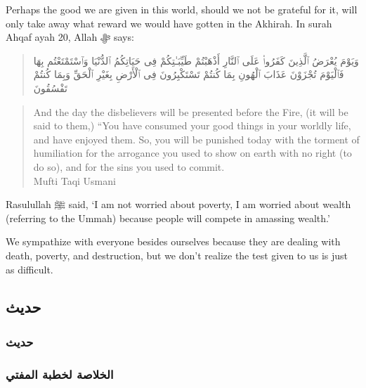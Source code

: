 \documentclass[
]{book}
\begin{document}
Perhaps the good we are given in this world, should we not be grateful for it, will only take away what reward we would have gotten in the Akhirah. In surah Ahqaf ayah 20, Allah ﷻ says:

\begin{quote}
وَيَوْمَ يُعْرَضُ ٱلَّذِينَ كَفَرُوا۟ عَلَى ٱلنَّارِ أَذْهَبْتُمْ طَيِّبَـٰتِكُمْ فِى حَيَاتِكُمُ ٱلدُّنْيَا وَٱسْتَمْتَعْتُم بِهَا فَٱلْيَوْمَ تُجْزَوْنَ عَذَابَ ٱلْهُونِ بِمَا كُنتُمْ تَسْتَكْبِرُونَ فِى ٱلْأَرْضِ بِغَيْرِ ٱلْحَقِّ وَبِمَا كُنتُمْ تَفْسُقُونَ
\end{quote}

\begin{quote}
And the day the disbelievers will be presented before the Fire, (it will be said to them,) ``You have consumed your good things in your worldly life, and have enjoyed them. So, you will be punished today with the torment of humiliation for the arrogance you used to show on earth with no right (to do so), and for the sins you used to commit.\\
Mufti Taqi Usmani
\end{quote}

Rasulullah ﷺ said, `I am not worried about poverty, I am worried about wealth (referring to the Ummah) because people will compete in amassing wealth.'

We sympathize with everyone besides ourselves because they are dealing with death, poverty, and destruction, but we don't realize the test given to us is just as difficult.

\hypertarget{ux62dux62fux64aux62b-15}{%
\subsection{حديث}\label{ux62dux62fux64aux62b-15}}

\hypertarget{ux62dux62fux64aux62b-16}{%
\subsubsection{حديث}\label{ux62dux62fux64aux62b-16}}

\begin{quote}
\end{quote}

\begin{quote}
\end{quote}

\hypertarget{ux627ux644ux62eux644ux627ux635ux629-ux644ux62eux637ux628ux629-ux627ux644ux645ux641ux62aux64a-14}{%
\subsubsection{الخلاصة لخطبة المفتي}\label{ux627ux644ux62eux644ux627ux635ux629-ux644ux62eux637ux628ux629-ux627ux644ux645ux641ux62aux64a-14}}
\end{document}
